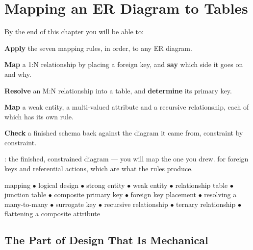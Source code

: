 \chapter{Mapping an ER Diagram to Tables}\label{ch:mapping}

\begin{outcomes}
By the end of this chapter you will be able to:
\begin{tight}
  \item \textbf{Apply} the seven mapping rules, in order, to any ER diagram.
  \item \textbf{Map} a 1:N relationship by placing a foreign key, and
        \textbf{say} which side it goes on and why.
  \item \textbf{Resolve} an M:N relationship into a table, and
        \textbf{determine} its primary key.
  \item \textbf{Map} a weak entity, a multi-valued attribute and a recursive
        relationship, each of which has its own rule.
  \item \textbf{Check} a finished schema back against the diagram it came
        from, constraint by constraint.
\end{tight}
\end{outcomes}

\begin{prereq}
: the finished, constrained diagram --- you will map the one
you drew.  for foreign keys and referential actions, which
are what the rules produce.
\end{prereq}

\begin{keyterms}
mapping $\bullet$ logical design $\bullet$ strong entity $\bullet$ weak entity
$\bullet$ relationship table $\bullet$ junction table $\bullet$ composite
primary key $\bullet$ foreign key placement $\bullet$ resolving a
many-to-many $\bullet$ surrogate key $\bullet$ recursive relationship
$\bullet$ ternary relationship $\bullet$ flattening a composite attribute
\end{keyterms}

\section{The Part of Design That Is Mechanical}

